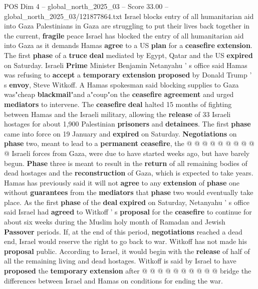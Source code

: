 \begin{textsample}{POS Dim 4 – global\_north\_2025\_03 – Score 33.00 – global\_north\_2025\_03/121877864.txt}  \label{ex:f4_pos_062}
Israel blocks entry of all humanitarian aid into Gaza Palestinians in Gaza are struggling to put their lives back together in the current, \textbf{fragile} peace Israel has blocked the entry of all humanitarian aid into Gaza as it demands Hamas \textbf{agree} to a US \textbf{plan} for a \textbf{ceasefire} \textbf{extension}.
The first \textbf{phase} of a \textbf{truce} \textbf{deal} mediated by Egypt, Qatar and the US \textbf{expired} on Saturday.
Israeli \textbf{Prime} Minister Benjamin Netanyahu ' s office said Hamas was refusing to \textbf{accept} a \textbf{temporary} \textbf{extension} \textbf{proposed} by Donald Trump ' s \textbf{envoy}, Steve Witkoff.
A Hamas spokesman said blocking supplies to Gaza was"cheap \textbf{blackmail}"and a"coup"on the \textbf{ceasefire} \textbf{agreement} and urged \textbf{mediators} to intervene.
The \textbf{ceasefire} \textbf{deal} halted 15 months of fighting between Hamas and the Israeli military, allowing the \textbf{release} of 33 Israeli hostages for about 1,900 Palestinian \textbf{prisoners} and \textbf{detainees}.
The first \textbf{phase} came into force on 19 January and \textbf{expired} on Saturday. \textbf{Negotiations} on \textbf{phase} two, meant to lead to a \textbf{permanent} \textbf{ceasefire}, the @ @ @ @ @ @ @ @ @ @ Israeli forces from Gaza, were due to have started weeks ago, but have barely begun. \textbf{Phase} three is meant to result in the \textbf{return} of all remaining bodies of dead hostages and the \textbf{reconstruction} of Gaza, which is expected to take years.
Hamas has previously said it will not \textbf{agree} to any \textbf{extension} of \textbf{phase} one without \textbf{guarantees} from the \textbf{mediators} that \textbf{phase} two would eventually take place.
As the first \textbf{phase} of the \textbf{deal} \textbf{expired} on Saturday, Netanyahu ' s office said Israel had \textbf{agreed} to Witkoff ' s \textbf{proposal} for the \textbf{ceasefire} to continue for about six weeks during the Muslim holy month of Ramadan and Jewish \textbf{Passover} periods.
If, at the end of this period, \textbf{negotiations} reached a dead end, Israel would reserve the right to go back to war.
Witkoff has not made his \textbf{proposal} public.
According to Israel, it would begin with the \textbf{release} of half of all the remaining living and dead hostages.
Witkoff is said by Israel to have \textbf{proposed} the \textbf{temporary} \textbf{extension} after @ @ @ @ @ @ @ @ @ @ bridge the differences between Israel and Hamas on conditions for ending the war.

\end{textsample}
